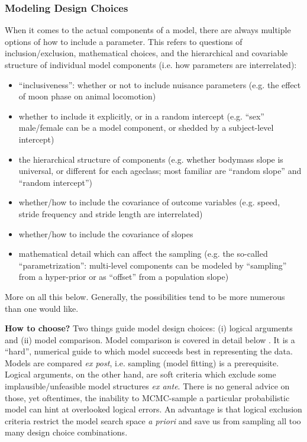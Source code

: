 \subsubsection{Modeling Design Choices}
\label{workflow:design:philosophy}
When it comes to the actual components of a model, there are always multiple options of how to include a parameter.
This refers to questions of inclusion/exclusion, mathematical choices, and the hierarchical and covariable structure of individual model components (i.e. how parameters are interrelated):
\begin{itemize}
\item ``inclusiveness'': whether or not to include nuisance parameters (e.g. the effect of moon phase on animal locomotion)
\item whether to include it explicitly, or in a random intercept (e.g. ``sex'' male/female can be a model component, or shedded by a subject-level intercept)
\item the hierarchical structure of components (e.g. whether bodymass slope is universal, or different for each ageclass; most familiar are ``random slope'' and ``random intercept'')
\item whether/how to include the covariance of outcome variables (e.g. speed, stride frequency and stride length are interrelated)
\item whether/how to include the covariance of slopes
\item mathematical detail which can affect the sampling (e.g. the so-called ``parametrization'': multi-level components can be modeled by ``sampling'' from a hyper-prior or as ``offset'' from a population slope)
\end{itemize}

More on all this below.
Generally, the possibilities tend to be more numerous than one would like.

\textbf{How to choose?} Two things guide model design choices: (i) logical arguments and (ii) model comparison.
Model comparison is covered in detail below .
It is a ``hard'', numerical guide to which model succeeds best in representing the data.
Models are compared \emph{ex post}, i.e. sampling (model fitting) is a prerequisite.
Logical arguments, on the other hand, are soft criteria which exclude some implausible/unfeasible model structures \emph{ex ante}.
There is no general advice on those, yet oftentimes, the inability to MCMC-sample a particular probabilistic model can hint at overlooked logical errors.
An advantage is that logical exclusion criteria restrict the model search space \emph{a priori} and save us from sampling all too many design choice combinations.


